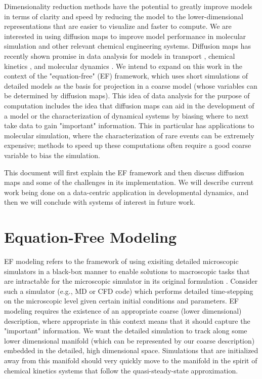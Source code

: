 \documentclass[12pt]{article}
\begin{document}
Dimensionality reduction methods have the potential to greatly improve models in terms of clarity and speed by reducing the model to the lower-dimensional representations that are easier to visualize and faster to compute. We are interested in using diffusion maps to improve model performance in molecular simulation and other relevant chemical engineering systems. Diffusion maps has recently shown promise in data analysis for models in transport \cite{Sonday2009}, chemical kinetics \cite{Chiavazzo2014}, and molecular dynamics \cite{Ferguson2010} \cite{Nedialkova2014} \cite{Kim2015}. We intend to expand on this work in the context of the "equation-free" (EF) framework, which uses short simulations of detailed models as the basis for projection in a coarse model (whose variables can be determined by diffusion maps). This idea of data analysis for the purpose of computation includes the idea that diffusion maps can aid in the development of a model or the characterization of dynamical systems by biasing where to next take data to gain "important" information. This in particular has applications to molecular simulation, where the characterization of rare events can be extremely expensive; methods to speed up these computations often require a good coarse variable to bias the simulation.  \vspace{1mm}

This document will first explain the EF framework and then discuss diffusion maps and some of the challenges in its implementation. We will describe current work being done on a data-centric application in developmental dynamics, and then we will conclude with systems of interest in future work.  \vspace{1mm}

\section{Equation-Free Modeling}

EF modeling refers to the framework of using exisiting detailed microscopic simulators in a black-box manner to enable solutions to macroscopic tasks that are intractable for the microscopic simulator in its original formulation \cite{Siettos2003} \cite{Kevrekidis2003} \cite{Kevrekidis2004}. Consider such a simulator (e.g., MD or CFD code) which performs detailed time-stepping on the microscopic level given certain initial conditions and parameters. EF modeling requires the existence of an appropriate coarse (lower dimensional) description, where appropriate in this context means that it should capture the "important" information. We want the detailed simulation to track along some lower dimensional manifold (which can be represented by our coarse description) embedded in the detailed, high dimensional space. Simulations that are initialized away from this manifold should very quickly move to the manifold in the spirit of chemical kinetics systems that follow the quasi-steady-state approximation. \vspace{1mm}
\end{document}
